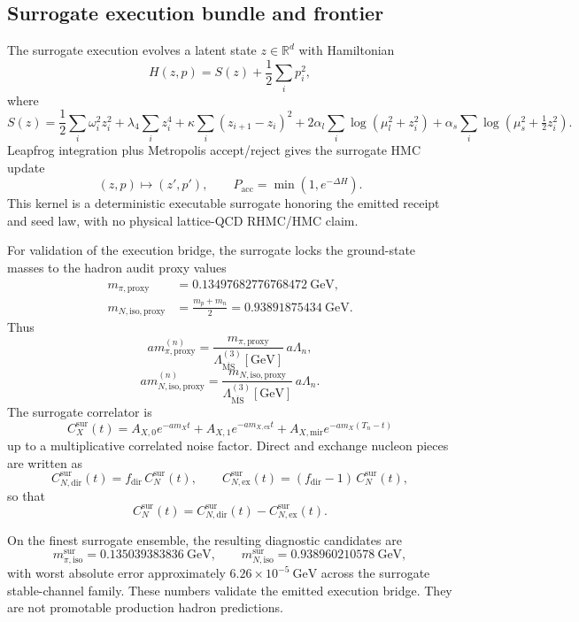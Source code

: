 \documentclass[11pt]{article}
\begin{document}
\subsection{Surrogate execution bundle and frontier}

The surrogate execution evolves a latent state \(z\in\mathbb{R}^d\) with Hamiltonian
\[
H(z,p) = S(z) + \frac12 \sum_i p_i^2,
\]
where
\[
S(z)
=
\frac12 \sum_i \omega_i^2 z_i^2
+
\lambda_4 \sum_i z_i^4
+
\kappa \sum_i (z_{i+1}-z_i)^2
+
2\alpha_l \sum_i \log(\mu_l^2 + z_i^2)
+
\alpha_s \sum_i \log(\mu_s^2 + \tfrac12 z_i^2).
\]
Leapfrog integration plus Metropolis accept/reject gives the surrogate HMC update
\[
(z,p) \mapsto (z',p'),
\qquad
P_{\mathrm{acc}} = \min(1,e^{-\Delta H}).
\]
This kernel is a deterministic executable surrogate honoring the emitted receipt and seed law,
with no physical lattice-QCD RHMC/HMC claim.

For validation of the execution bridge, the surrogate locks the ground-state masses to the hadron
audit proxy values
\[
\begin{aligned}
m_{\pi,\mathrm{proxy}}
&=0.13497682776768472\ \mathrm{GeV},\\
m_{N,\mathrm{iso,proxy}}
&=
\frac{m_p+m_n}{2}
=
0.93891875434\ \mathrm{GeV}.
\end{aligned}
\]
Thus
\[
a m_{\pi,\mathrm{proxy}}^{(n)}
=
\frac{m_{\pi,\mathrm{proxy}}}{\Lambda_{\overline{\mathrm{MS}}}^{(3)}[\mathrm{GeV}]}
\,a\Lambda_n,
\]
\[
a m_{N,\mathrm{iso,proxy}}^{(n)}
=
\frac{m_{N,\mathrm{iso,proxy}}}{\Lambda_{\overline{\mathrm{MS}}}^{(3)}[\mathrm{GeV}]}
\,a\Lambda_n.
\]
The surrogate correlator is
\[
C_X^{\mathrm{sur}}(t)
=
A_{X,0} e^{-a m_X t}
+
A_{X,1} e^{-a m_{X,\mathrm{ex}} t}
+
A_{X,\mathrm{mir}} e^{-a m_X (T_n-t)}
\]
up to a multiplicative correlated noise factor. Direct and exchange nucleon pieces are written as
\[
C_{N,\mathrm{dir}}^{\mathrm{sur}}(t)
=
f_{\mathrm{dir}}\,C_N^{\mathrm{sur}}(t),
\qquad
C_{N,\mathrm{ex}}^{\mathrm{sur}}(t)
=
(f_{\mathrm{dir}}-1)\,C_N^{\mathrm{sur}}(t),
\]
so that
\[
C_N^{\mathrm{sur}}(t)
=
C_{N,\mathrm{dir}}^{\mathrm{sur}}(t)
-
C_{N,\mathrm{ex}}^{\mathrm{sur}}(t).
\]

On the finest surrogate ensemble, the resulting diagnostic candidates are
\[
m_{\pi,\mathrm{iso}}^{\mathrm{sur}} = 0.135039383836\ \mathrm{GeV},
\qquad
m_{N,\mathrm{iso}}^{\mathrm{sur}} = 0.938960210578\ \mathrm{GeV},
\]
with worst absolute error approximately \(6.26\times10^{-5}\ \mathrm{GeV}\) across the surrogate
stable-channel family. These numbers validate the emitted execution bridge. They are not
promotable production hadron predictions.
\end{document}
